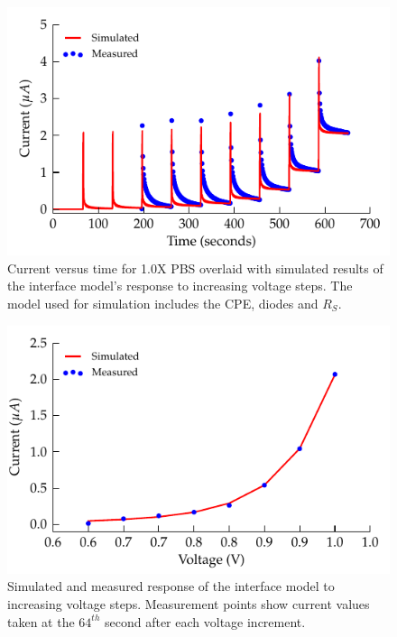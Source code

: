 \documentclass[10pt,final,journal]{IEEEtran}
\begin{document}
\begin{figure}
    \begin{center}
        \includegraphics{graphics/faradaic_currentVsTime_IEEE}
    \end{center}
    \caption{Current versus time for 1.0X PBS overlaid with simulated results of the interface model's response to increasing voltage steps. The model used for simulation includes the CPE, diodes and $R_{S}$.}
    \label{fig:faradaic_currentVsTime}
\end{figure}

\begin{figure}
    \begin{center}
        \includegraphics{graphics/faradaic_currentVsVoltage_IEEE}
    \end{center}
    \caption{Simulated and measured response of the interface model to increasing voltage steps. Measurement points show current values taken at the $64^{th}$ second after each voltage increment.}
    \label{fig:faradaic_currentVsVoltage}
\end{figure}
\end{document}
